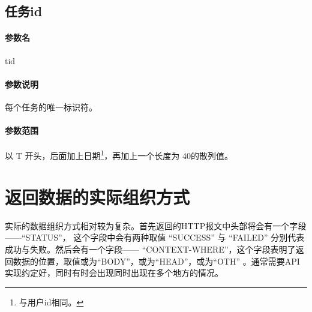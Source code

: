 \documentclass[UTF8]{dingo}
\def\参数名#1{\paragraph{\colorbox[rgb]{0.9,0.5,0.5}{参数名}}#1}
\def\说明{\paragraph{\colorbox[rgb]{0.7,0.7,0.8}{参数说明}}}
\def\范围{\paragraph{\colorbox[rgb]{0.9,0.7,0.7}{参数范围}}}
\begin{document}
\begin{appendices}
        \subsection{任务id}
            \参数名{tid}
            \说明 每个任务的唯一标识符。
            \范围 以 T 开头，后面加上日期\footnote{与用户id相同。}，再加上一个长度为
            40的散列值。
        \section{返回数据的实际组织方式}
        实际的数据组织方式相对较为复杂。首先返回的HTTP报文中头部将会有一个字段——“STATUS”，
        这个字段中会有两种取值 “SUCCESS” 与 “FAILED” 分别代表成功与失败。然后会有一个字段——
        “CONTEXT-WHERE”，这个字段表明了返回数据的位置，取值或为“BODY”，或为“HEAD”，或为“OTH”
        。通常需要API实现约定好，同时有时会出现同时出现在多个地方的情况。
    \end{appendices}
\end{document}
